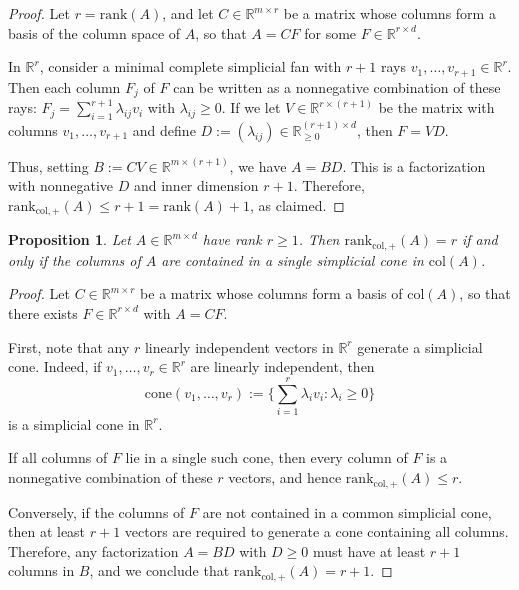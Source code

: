 \documentclass{article}
\newtheorem{prop}[theorem]{Proposition}
\theoremstyle{definition}
\newcommand{\nncr}[1]{\mathrm{rank}_{\mathrm{col},+}(#1)}
\begin{document}
\begin{proof} 
Let \(r = \mathrm{rank}(A)\), and let \(C \in \mathbb{R}^{m \times r}\) be a matrix whose columns form a basis of the column space of \(A\), so that \(A = C F\) for some \(F \in \mathbb{R}^{r \times d}\). 

In \(\mathbb{R}^r\), consider a minimal complete simplicial fan with \(r+1\) rays \(v_1, \dots, v_{r+1} \in \mathbb{R}^r\). Then each column \(F_j\) of \(F\) can be written as a nonnegative combination of these rays: 
\(F_j = \sum_{i=1}^{r+1} \lambda_{ij} v_i\) with \(\lambda_{ij} \ge 0\). 
%
If we let \(V \in \mathbb{R}^{r \times (r+1)}\) be the matrix with columns \(v_1, \dots, v_{r+1}\) and define \(D := (\lambda_{ij}) \in \mathbb{R}_{\ge 0}^{(r+1) \times d}\), then \(F = V D\). 

Thus, setting \(B := C V \in \mathbb{R}^{m \times (r+1)}\), we have \(A = B D\). 
This is a factorization with nonnegative \(D\) and inner dimension \(r+1\). 
Therefore, \(\mathrm{rank}_{\mathrm{col},+}(A) \le r + 1 = \mathrm{rank}(A) + 1\), as claimed. 
\end{proof}

\begin{prop}
\label{prop:whennncr=rank}
Let $A \in \mathbb{R}^{m \times d}$ have rank $r \ge 1$. 
Then $\nncr{A} = r$ 
if and only if the columns of $A$ are contained in a single simplicial cone in $\mathrm{col}(A)$. 
\end{prop}

\begin{proof}
Let $C \in \mathbb{R}^{m \times r}$ be a matrix whose columns form a basis of $\mathrm{col}(A)$, so that there exists $F \in \mathbb{R}^{r \times d}$ with $A = C F$. 

First, note that any $r$ linearly independent vectors in $\mathbb{R}^r$ generate a simplicial cone. Indeed, if $v_1, \dots, v_r \in \mathbb{R}^r$ are linearly independent, then 
\[
\mathrm{cone}(v_1, \dots, v_r) := \Big\{\sum_{i=1}^r \lambda_i v_i : \lambda_i \ge 0 \Big\}
\]
is a simplicial cone in $\mathbb{R}^r$. 

If all columns of $F$ lie in a single such cone, then every column of $F$ is a nonnegative combination of these $r$ vectors, and hence $\mathrm{rank}_{\mathrm{col},+}(A) \le r$. 

Conversely, if the columns of $F$ are not contained in a common simplicial cone, then at least $r+1$ vectors are required to generate a cone containing all columns. 
Therefore, any factorization $A = B D$ with $D \ge 0$ must have at least $r+1$ columns in %
$B$, 
and we conclude that $\mathrm{rank}_{\mathrm{col},+}(A) = r+1$. 
\end{proof}
\end{document}
